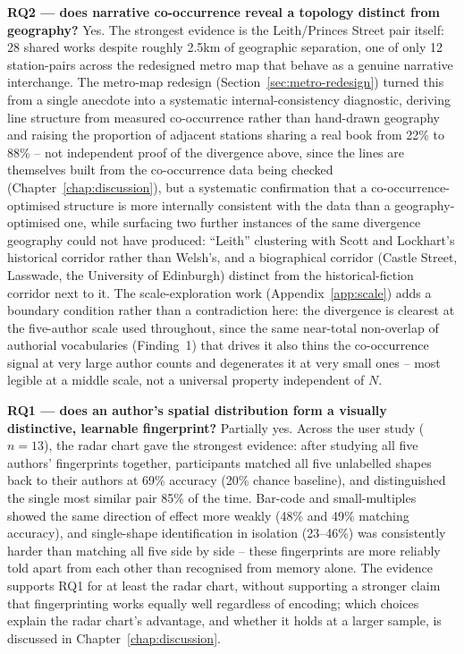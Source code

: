 \documentclass[logo,msc]{infthesis}
\begin{document}
\textbf{RQ2 --- does narrative co-occurrence reveal a topology distinct from geography?} Yes. The strongest evidence is the Leith/Princes Street pair itself: 28 shared works despite roughly 2.5km of geographic separation, one of only 12 station-pairs across the redesigned metro map that behave as a genuine narrative interchange. The metro-map redesign (Section~\ref{sec:metro-redesign}) turned this from a single anecdote into a systematic internal-consistency diagnostic, deriving line structure from measured co-occurrence rather than hand-drawn geography and raising the proportion of adjacent stations sharing a real book from 22\% to 88\% -- not independent proof of the divergence above, since the lines are themselves built from the co-occurrence data being checked (Chapter~\ref{chap:discussion}), but a systematic confirmation that a co-occurrence-optimised structure is more internally consistent with the data than a geography-optimised one, while surfacing two further instances of the same divergence geography could not have produced: ``Leith'' clustering with Scott and Lockhart's historical corridor rather than Welsh's, and a biographical corridor (Castle Street, Lasswade, the University of Edinburgh) distinct from the historical-fiction corridor next to it. The scale-exploration work (Appendix~\ref{app:scale}) adds a boundary condition rather than a contradiction here: the divergence is clearest at the five-author scale used throughout, since the same near-total non-overlap of authorial vocabularies (Finding~1) that drives it also thins the co-occurrence signal at very large author counts and degenerates it at very small ones -- most legible at a middle scale, not a universal property independent of $N$.

\textbf{RQ1 --- does an author's spatial distribution form a visually distinctive, learnable fingerprint?} Partially yes. Across the user study ($n=13$), the radar chart gave the strongest evidence: after studying all five authors' fingerprints together, participants matched all five unlabelled shapes back to their authors at 69\% accuracy (20\% chance baseline), and distinguished the single most similar pair 85\% of the time. Bar-code and small-multiples showed the same direction of effect more weakly (48\% and 49\% matching accuracy), and single-shape identification in isolation (23--46\%) was consistently harder than matching all five side by side -- these fingerprints are more reliably told apart from each other than recognised from memory alone. The evidence supports RQ1 for at least the radar chart, without supporting a stronger claim that fingerprinting works equally well regardless of encoding; which choices explain the radar chart's advantage, and whether it holds at a larger sample, is discussed in Chapter~\ref{chap:discussion}.
\end{document}
